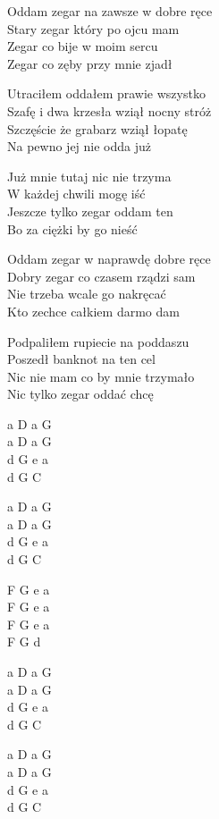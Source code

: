 \begin{text}
    Oddam zegar na zawsze w dobre ręce\\
    Stary zegar który po ojcu mam\\
    Zegar co bije w moim sercu\\
    Zegar co zęby przy mnie zjadł

    Utraciłem oddałem prawie wszystko\\
    Szafę i dwa krzesła wziął nocny stróż\\
    Szczęście że grabarz wziął łopatę\\
    Na pewno jej nie odda już

    \vin Już mnie tutaj nic nie trzyma\\
    \vin W każdej chwili mogę iść\\
    \vin Jeszcze tylko zegar oddam ten\\
    \vin Bo za ciężki by go nieść

    Oddam zegar w naprawdę dobre ręce\\
    Dobry zegar co czasem rządzi sam\\
    Nie trzeba wcale go nakręcać\\
    Kto zechce całkiem darmo dam

    Podpaliłem rupiecie na poddaszu\\
    Poszedł banknot na ten cel\\
    Nic nie mam co by mnie trzymało\\
    Nic tylko zegar oddać chcę
\end{text}
\begin{chord}
    a D a G\\
    a D a G\\
    d G e a\\
    d G C

    a D a G\\
    a D a G\\
    d G e a\\
    d G C

    F G e a\\
    F G e a\\
    F G e a\\
    F G d

    a D a G\\
    a D a G\\
    d G e a\\
    d G C

    a D a G\\
    a D a G\\
    d G e a\\
    d G C
\end{chord}
